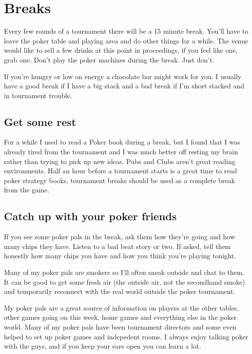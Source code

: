 \chapter{Breaks}


Every few rounds of a tournament there will be a 15 minute break.
You'll have to leave the poker table and playing area
and do other things for a while. The venue would like to sell
a few drinks at this point in proceedings, if you feel like one, grab one. 
Don't play the poker machines during the break. Just don't.

If you're hungry or low on energy a chocolate bar might work
for you. I usually have a good break if I have a big stack
and a bad break if I'm short stacked and in tournament trouble.

\section*{Get some rest}

For a while I used to read a Poker book during a break, but I 
found that I was already tired from the tournament and I was much better 
off resting my brain rather than trying to pick up new ideas. 
Pubs and Clubs aren't great reading environments. Half an hour before a
tournament starts is a great time to read poker strategy books,
tournament breaks should be used as a complete break from the game.

\section*{Catch up with your poker friends}

If you see some poker pals in the break, ask them how they're
going and how many chips they have. Listen to a bad beat story
or two. If asked, tell them honestly how
many chips you have and how you think you're playing tonight.

Many of my poker pals are smokers so I'll often sneak outside and
chat to them. It can be good to get some fresh air (the outside
air, not the secondhand smoke) and temporarily reconnect with
the real world outside the poker tournament.

My poker pals are a great source of information on players
at the other tables, other games going on this week, home games
and everything else in the poker world. Many of my poker pals
have been tournament directors and some even helped to set up
poker games and indepedent rooms. I always 
enjoy talking poker with the guys, and if you keep your ears open 
you can learn a lot.

